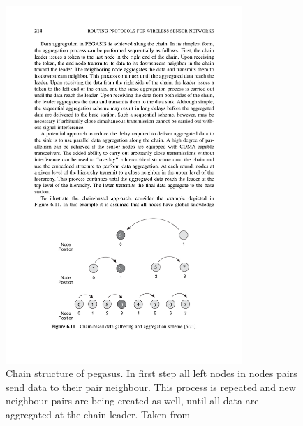 \begin{figure}[ht]
    \centering
    \includegraphics[width=0.8\textwidth]{00images/chain-pegasis}
    \caption{Chain structure of \acrshort{pegasus}. In first step all left nodes in nodes pairs send data to their pair neighbour. This process is repeated and new neighbour pairs are being created as well, until all data are aggregated at the chain leader. Taken from~\cite{Sohraby2007WirelessApplications}}
    \label{fig:chain-pegasis}
\end{figure}

